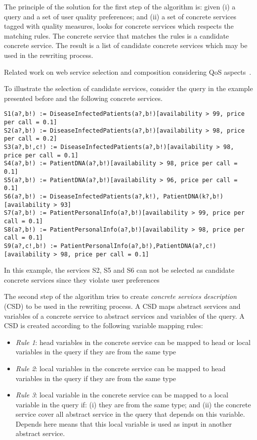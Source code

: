 \documentclass[12pt,a4paper,oneside]{article}
\begin{document}
The principle of the solution for the first step of the algorithm is: given (i) a query and a set of user quality preferences; and (ii) a set of concrete services tagged with quality measures, looks for concrete services which respects the matching rules. The concrete service that matches the rules is a candidate concrete service. The result is a list of candidate concrete services which may be used in the rewriting process.

Related work on web service selection and composition considering QoS aspects~\cite{}. 

To illustrate the selection of candidate services, consider the query in the example presented before and the following concrete services.
\begin{tiny}
\begin{verbatim}
S1(a?,b!) := DiseaseInfectedPatients(a?,b!)[availability > 99, price per call = 0.1]
S2(a?,b!) := DiseaseInfectedPatients(a?,b!)[availability > 98, price per call = 0.2]
S3(a?,b!,c!) := DiseaseInfectedPatients(a?,b!)[availability > 98, price per call = 0.1]
S4(a?,b!) := PatientDNA(a?,b!)[availability > 98, price per call = 0.1]
S5(a?,b!) := PatientDNA(a?,b!)[availability > 96, price per call = 0.1]
S6(a?,b!) := DiseaseInfectedPatients(a?,k!), PatientDNA(k?,b!)[availability > 93]
S7(a?,b!) := PatientPersonalInfo(a?,b!)[availability > 99, price per call = 0.1]
S8(a?,b!) := PatientPersonalInfo(a?,b!)[availability > 98, price per call = 0.1]
S9(a?,c!,b!) := PatientPersonalInfo(a?,b!),PatientDNA(a?,c!)[availability > 98, price per call = 0.1] 
\end{verbatim}
\end{tiny}

In this example, the services S2, S5 and S6 can not be selected as candidate concrete services since they violate user preferences

The second step of the algorithm tries to create \textit{concrete services description} (CSD) to be used in the rewriting process. A CSD maps abstract services and variables of a concrete service to abstract services and variables of the query. A CSD is created according to the following variable mapping rules:
\begin{itemize}
\item \textit{Rule 1}: head variables in the concrete service can be mapped to head or local variables in the query if they are from the same type
\item \textit{Rule 2}: local variables in the concrete service can be mapped to head variables in the query if they are from the same type
\item \textit{Rule 3}: local variable in the concrete service can be mapped to a local variable in the query if: (i) they are from the same type; and (ii) the concrete service cover all abstract service in the query that depends on this variable. Depends here means that this local variable is used as input in another abstract service.
\end{itemize}
\end{document}
